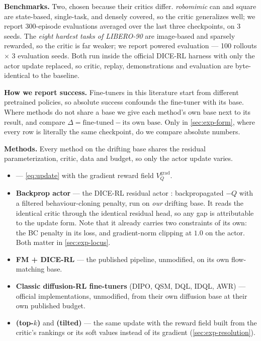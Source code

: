\textbf{Benchmarks.} Two, chosen because their critics differ.
\emph{robomimic} can and square are state-based, single-task, and densely
covered, so the critic generalizes well; we report 300-episode evaluations
averaged over the last three checkpoints, on 3 seeds. The \emph{eight
hardest tasks of LIBERO-90} are image-based and sparsely rewarded, so the
critic is far weaker; we report powered evaluation --- 100 rollouts $\times$
3 evaluation seeds. Both run inside the official DICE-RL harness with only
the actor update replaced, so critic, replay, demonstrations and evaluation
are byte-identical to the baseline.

\textbf{How we report success.} Fine-tuners in this literature start from
different pretrained policies, so absolute success confounds the fine-tuner
with its base. Where methods do not share a base we give each method's own
base next to its result, and compare
$\Delta = \text{fine-tuned} - \text{its own base}$. Only in
\cref{sec:exp-form}, where every row is literally the same checkpoint, do we
compare absolute numbers.

\textbf{Methods.} Every method on the drifting base shares the residual
parameterization, critic, data and budget, so only the actor update varies.

\begin{itemize}
  \item \textbf{\method{}} --- \cref{eq:update} with the gradient reward
  field $V_Q^{\mathrm{grad}}$.
  \item \textbf{Backprop actor} --- the DICE-RL residual actor
  \citep{dicerl2026}: backpropagated $-Q$ with a filtered behaviour-cloning
  penalty, run on \emph{our} drifting base. It reads the identical critic
  through the identical residual head, so any gap is attributable to the
  update form. Note that it already carries two constraints of its own: the
  BC penalty in its loss, and gradient-norm clipping at $1.0$ on the actor.
  Both matter in \cref{sec:exp-locus}.
  \item \textbf{FM + DICE-RL} --- the published pipeline, unmodified, on its
  own flow-matching base.
  \item \textbf{Classic diffusion-RL fine-tuners} (DIPO, QSM, DQL, IDQL,
  AWR) --- official implementations, unmodified, from their own diffusion
  base at their own published budget.
  \item \textbf{\method{} (top-$k$)} and \textbf{(tilted)} --- the same
  update with the reward field built from the critic's rankings or its soft
  values instead of its gradient (\cref{sec:exp-resolution}).
\end{itemize}

